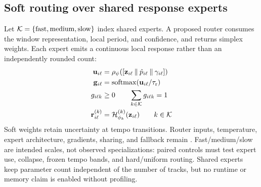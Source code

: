 \subsection{Soft routing over shared response experts}
Let \(\mathcal{K}=\{\mathrm{fast},\mathrm{medium},\mathrm{slow}\}\) index shared
experts. A proposed router consumes the window representation, local period,
and confidence, and returns simplex weights. Each expert emits a continuous
local response rather than an independently rounded count:
\begin{equation}
\begin{aligned}
 \mathbf{u}_{i\ell} &=
 \rho_\psi([\mathbf{z}_{i\ell}\mathbin\Vert\hat p_{i\ell}\mathbin\Vert\gamma_{i\ell}]) \\
 \mathbf{g}_{i\ell} &= \operatorname{softmax}(\mathbf{u}_{i\ell}/\tau_{\mathrm r}) \\
 g_{i\ell k}&\geq0\qquad \sum_{k\in\mathcal{K}}g_{i\ell k}=1 \\
 \mathbf{r}^{(k)}_{i\ell} &=
 \mathcal{H}^{(k)}_{\phi_k}(\mathbf{z}_{i\ell})\qquad k\in\mathcal{K}
\end{aligned}
\label{eq:routing}
\end{equation}
\noindent Soft weights retain uncertainty at tempo transitions. Router inputs,
temperature, expert architecture, gradients, sharing, and fallback remain
. Fast/medium/slow are intended
scales, not observed specializations: paired controls must test expert use,
collapse, frozen tempo bands, and hard/uniform routing. Shared experts keep
parameter count independent of the number of tracks, but no runtime or memory
claim is enabled without profiling.

